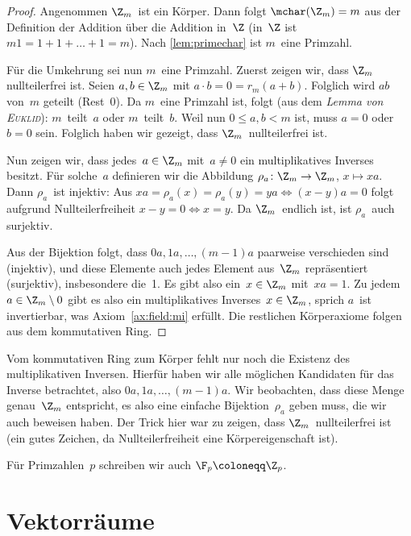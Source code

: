 \documentclass[a4paper]{article}
\begin{document}
\begin{proof}
    Angenommen $\Z_m$~ist ein Körper. Dann folgt $\mchar(\Z_m) = m$ aus der Definition der Addition über die Addition in~$\Z$ (in~$\Z$ ist $m1 = 1+1+\dots+1 = m$). Nach \cref{lem:primechar} ist $m$~eine Primzahl.

    Für die Umkehrung sei nun $m$~eine Primzahl. Zuerst zeigen wir, dass $\Z_m$ nullteilerfrei ist. Seien $a, b \in \Z_m$ mit $a\cdot b = 0 = r_m(a+b)$. Folglich wird $ab$ von~$m$ geteilt (Rest~0). Da $m$~eine Primzahl ist, folgt (aus dem \emph{Lemma von \textsc{Euklid}}): $m$~teilt~$a$ oder $m$~teilt~$b$. Weil nun $0 \leq a, b < m$ ist, muss $a = 0$ oder $b = 0$ sein. Folglich haben wir gezeigt, dass $\Z_m$~nullteilerfrei ist.

    Nun zeigen wir, dass jedes~$a \in \Z_m$ mit~$a \neq 0$ ein multiplikatives Inverses besitzt. Für solche~$a$ definieren wir die Abbildung $\rho_a\colon \Z_m \to \Z_m$, $x \mapsto xa$. Dann $\rho_a$~ist injektiv: Aus $xa = \rho_a(x) = \rho_a(y) = ya \iff (x-y)a = 0$ folgt aufgrund Nullteilerfreiheit $x-y = 0 \iff x = y$. Da $\Z_m$~endlich ist, ist $\rho_a$~auch surjektiv.

    Aus der Bijektion folgt, dass $0a, 1a, \dots, (m-1)a$ paarweise verschieden sind (injektiv), und diese Elemente auch jedes Element aus~$\Z_m$ repräsentiert (surjektiv), insbesondere die~1. Es gibt also ein~$x \in \Z_m$ mit~$xa = 1$. Zu jedem~$a \in \Z_m \setminus{0}$ gibt es also ein multiplikatives Inverses~$x \in \Z_m$, sprich $a$~ist invertierbar, was Axiom~\ref{ax:field:mi} erfüllt. Die restlichen Körperaxiome folgen aus dem kommutativen Ring.
\end{proof}

Vom kommutativen Ring zum Körper fehlt nur noch die Existenz des multiplikativen Inversen. Hierfür haben wir alle möglichen Kandidaten für das Inverse betrachtet, also $0a, 1a, \dots, (m-1)a$. Wir beobachten, dass diese Menge genau~$\Z_m$ entspricht, es also eine einfache Bijektion~$\rho_a$ geben muss, die wir auch beweisen haben. Der Trick hier war zu zeigen, dass $\Z_m$~nullteilerfrei ist (ein gutes Zeichen, da Nullteilerfreiheit eine Körpereigenschaft ist).

\begin{notation}
    Für Primzahlen~$p$ schreiben wir auch $\F_p \coloneqq \Z_p$.
\end{notation}

\section{Vektorräume}
\end{document}
